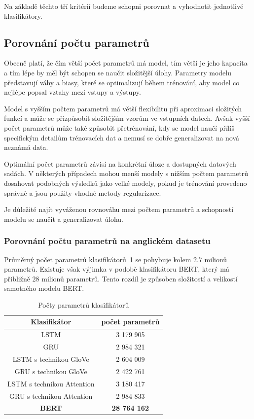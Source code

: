 Na základě těchto tří kritérií budeme schopni porovnat a vyhodnotit jednotlivé klasifikátory.

\subsection{Porovnání počtu parametrů}
Obecně platí, že čím větší počet parametrů má model, tím větší je jeho kapacita a tím lépe by měl být schopen se naučit složitější úlohy.
Parametry modelu představují váhy a biasy, které se optimalizují během trénování, aby model co nejlépe popsal vztahy mezi vstupy a výstupy.

Model s vyšším počtem parametrů má větší flexibilitu při aproximaci složitých funkcí a může se přizpůsobit složitějším vzorům ve vstupních datech.
Avšak vyšší počet parametrů může také způsobit přetrénování, kdy se model naučí příliš specifickým detailům trénovacích dat a nemusí se dobře generalizovat na nová neznámá data.

Optimální počet parametrů závisí na konkrétní úloze a dostupných datových sadách.
V některých případech mohou menší modely s nižším počtem parametrů dosahovat podobných výsledků jako velké modely, pokud je trénování provedeno správně a jsou použity vhodné metody regularizace.

Je důležité najít vyváženou rovnováhu mezi počtem parametrů a schopností modelu se naučit a generalizovat úlohu.

\subsubsection{Porovnání počtu parametrů na anglickém datasetu}
Průměrný počet parametrů klasifikátorů~\ref{tab:res pocet parametru} se pohybuje kolem 2.7 milionů parametrů.
Existuje však výjimka v podobě klasifikátoru BERT, který má přibližně 28 milionů parametrů.
Tento rozdíl je způsoben složitostí a velikostí samotného modelu BERT.\@

\begin{table}[H]
	\centering
	\caption{Počty parametrů klasifikátorů}\label{tab:res pocet parametru}
	\begin{tabular}{ c c }
			\toprule
			Klasifikátor & počet parametrů\\
			\midrule
			LSTM & 3 179 905\\
			GRU & 2 984 321\\         
			LSTM s technikou GloVe & 2 604 009\\         
			GRU s technikou GloVe & 2 422 761\\         
			LSTM s technikou Attention & 3 180 417\\         
			GRU s technikou Attention & 2 984 833\\         
			\textbf{BERT} & \textbf{28 764 162}\\         
			\midrule
		\end{tabular}
\end{table}

